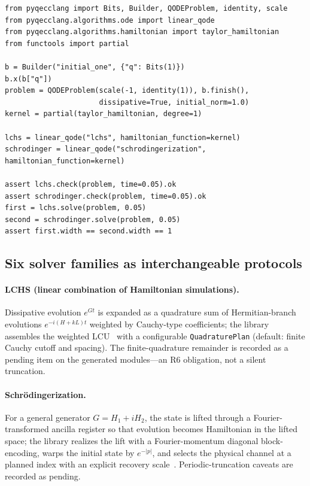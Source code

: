 \begin{lstlisting}[style=pyqpython, caption={One problem, two solver families (verbatim from the doctested tutorial).  Both generators return one-qubit state oracles for $u'=-u$, $t=0.05$; their ancilla structure, approximation route, and recovery conditions differ.  The tutorial is explicit that this checks \emph{assembly}: a degree-one Taylor kernel does not certify an arbitrary-precision solution---promise provenance (R6) records that boundary.}, label={lst:qode-swap}]
from pyqecclang import Bits, Builder, QODEProblem, identity, scale
from pyqecclang.algorithms.ode import linear_qode
from pyqecclang.algorithms.hamiltonian import taylor_hamiltonian
from functools import partial

b = Builder("initial_one", {"q": Bits(1)})
b.x(b["q"])
problem = QODEProblem(scale(-1, identity(1)), b.finish(),
                      dissipative=True, initial_norm=1.0)
kernel = partial(taylor_hamiltonian, degree=1)

lchs = linear_qode("lchs", hamiltonian_function=kernel)
schrodinger = linear_qode("schrodingerization", hamiltonian_function=kernel)

assert lchs.check(problem, time=0.05).ok
assert schrodinger.check(problem, time=0.05).ok
first = lchs.solve(problem, 0.05)
second = schrodinger.solve(problem, 0.05)
assert first.width == second.width == 1
\end{lstlisting}

\subsection{Six solver families as interchangeable protocols}
\label{sec:ode-solvers}

\paragraph{LCHS (linear combination of Hamiltonian simulations).}
Dissipative evolution $e^{Gt}$ is expanded as a quadrature sum of
Hermitian-branch evolutions $e^{-i(H + kL)t}$ weighted by Cauchy-type
coefficients; the library assembles the weighted LCU~\cite{an2026lchs} with a configurable
\texttt{QuadraturePlan} (default: finite Cauchy cutoff and spacing).  The
finite-quadrature remainder is recorded as a pending item on the generated
modules---an R6 obligation, not a silent truncation.

\paragraph{Schr\"odingerization.}
For a general generator $G = H_1 + iH_2$, the state is lifted through a
Fourier-transformed ancilla register so that evolution becomes Hamiltonian
in the lifted space; the library realizes the lift with a
Fourier-momentum diagonal block-encoding, warps the initial state by
$e^{-|p|}$, and selects the physical channel at a planned index with an
explicit recovery scale~\cite{jin2024schrodingerization,hu2024schrocircuits}.  Periodic-truncation caveats are recorded as
pending.

